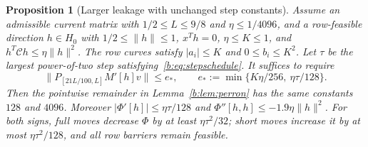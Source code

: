 \documentclass[11pt]{amsart}
\newtheorem{proposition}[theorem]{Proposition}
\theoremstyle{definition}\newtheorem{definition}[theorem]{Definition}
\theoremstyle{remark}\newtheorem{remark}[theorem]{Remark}
\numberwithin{equation}{section}
\begin{document}
\begin{proposition}[Larger leakage with unchanged step constants]\label{r:tolerance}
Assume an admissible current matrix with $1/2\le L\le9/8$ and
$\eta\le1/4096$, and a row-feasible direction $h\in H_0$ with
$1/2\le\|h\|\le1$, $x^Th=0$, $\eta\le K\le1$, and
$h^T\mathcal C h\le\eta\|h\|^2$. The row curves satisfy $|a_i|\le K$ and
$0\le b_i\le K^2$.
Let $\tau$ be the largest power-of-two step satisfying~\eqref{b:eq:stepschedule}. It suffices to require
\[
 \|P_{[21L/100,L]}M'[h]v\|\le e_*,\qquad
 e_*:=\min\{K\eta/256,\ \eta\tau/128\}.
\]
Then the pointwise remainder in Lemma~\ref{b:lem:perron} has the same
constants $128$ and $4096$. Moreover
$|\Phi'[h]|\le\eta\tau/128$ and
$\Phi''[h,h]\le-1.9\eta\|h\|^2$.
For both signs, full moves decrease $\Phi$ by at least $\eta\tau^2/32$;
short moves increase it by at most $\eta\tau^2/128$, and all row barriers
remain feasible.
\end{proposition}
\end{document}
